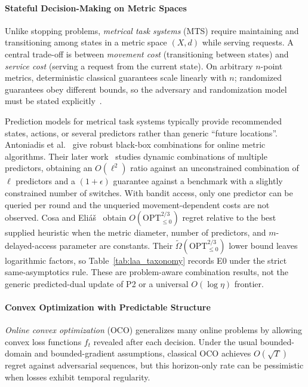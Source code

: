 \documentclass[acmsmall,screen,nonacm]{acmart}
\theoremstyle{acmdefinition}%
\begin{document}
\paragraph{Stateful Decision-Making on Metric Spaces}
Unlike stopping problems, \emph{metrical task systems} (MTS) require maintaining and transitioning among states in a metric space $(X, d)$ while serving requests. A central trade-off is between \emph{movement cost} (transitioning between states) and \emph{service cost} (serving a request from the current state). On arbitrary $n$-point metrics, deterministic classical guarantees scale linearly with $n$; randomized guarantees obey different bounds, so the adversary and randomization model must be stated explicitly~\cite{antoniadis2020metric}.

Prediction models for metrical task systems typically provide recommended states, actions, or several predictors rather than generic ``future locations''. Antoniadis et al.~\cite{antoniadis2020metric} give robust black-box combinations for online metric algorithms. Their later work~\cite{antoniadis2023mixing} studies dynamic combinations of multiple predictors, obtaining an $O(\ell^2)$ ratio against an unconstrained combination of $\ell$ predictors and a $(1+\epsilon)$ guarantee against a benchmark with a slightly constrained number of switches. With bandit access, only one predictor can be queried per round and the unqueried movement-dependent costs are not observed. Cosa and Eli\'a\v{s}~\cite{cosa2025bandit} obtain $O(\!\mathrm{OPT}_{\leq0}^{2/3})$ regret relative to the best supplied heuristic when the metric diameter, number of predictors, and $m$-delayed-access parameter are constants. Their $\widetilde\Omega(\!\mathrm{OPT}_{\leq0}^{2/3})$ lower bound leaves logarithmic factors, so Table~\ref{tab:laa_taxonomy} records E0 under the strict same-asymptotics rule. These are problem-aware combination results, not the generic predicted-dual update of P2 or a universal $O(\log\eta)$ frontier.

\paragraph{Convex Optimization with Predictable Structure}
\emph{Online convex optimization} (OCO) generalizes many online problems by allowing convex loss functions $f_t$ revealed after each decision. Under the usual bounded-domain and bounded-gradient assumptions, classical OCO achieves $O(\sqrt{T})$ regret against adversarial sequences, but this horizon-only rate can be pessimistic when losses exhibit temporal regularity.
\end{document}

